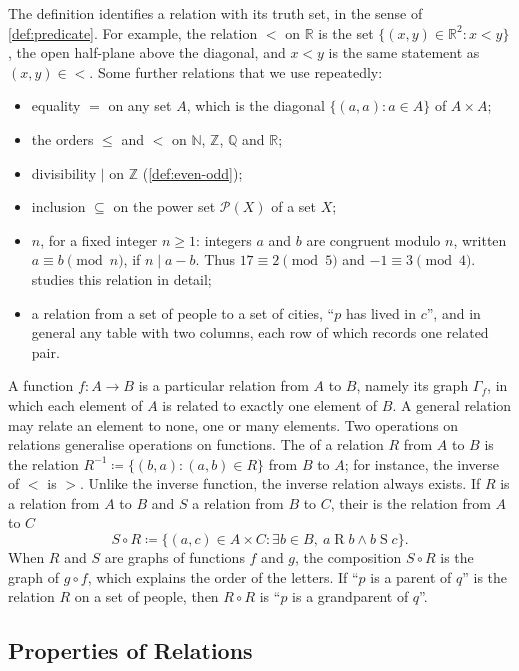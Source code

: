 The definition identifies a relation with its truth set, in the sense of \cref{def:predicate}. For example, the relation $<$ on $\mathbb R$ is the set $\{(x,y)\in\mathbb R^2: x<y\}$, the open half-plane above the diagonal, and $x<y$ is the same statement as $(x,y)\in{<}$. Some further relations that we use repeatedly:
\begin{itemize}
\item equality $=$ on any set $A$, which is the diagonal $\{(a,a): a\in A\}$ of $A\times A$;
\item the orders $\le$ and $<$ on $\mathbb N$, $\mathbb Z$, $\mathbb Q$ and $\mathbb R$;
\item divisibility $\mid$ on $\mathbb Z$ (\cref{def:even-odd});
\item inclusion $\subseteq$ on the power set $\mathcal P(X)$ of a set $X$;
\item {} $n$, for a fixed integer $n\ge1$: integers $a$ and $b$ are congruent modulo $n$, written $a\equiv b\pmod n$, if $n\mid a-b$. Thus $17\equiv2\pmod5$ and $-1\equiv3\pmod4$.  studies this relation in detail;
\item a relation from a set of people to a set of cities, ``$p$ has lived in $c$'', and in general any table with two columns, each row of which records one related pair.
\end{itemize}

A function $f\colon A\to B$ is a particular relation from $A$ to $B$, namely its graph $\Gamma_f$, in which each element of $A$ is related to exactly one element of $B$. A general relation may relate an element to none, one or many elements. Two operations on relations generalise operations on functions. The  of a relation $R$ from $A$ to $B$ is the relation $R^{-1}\coloneqq\{(b,a): (a,b)\in R\}$ from $B$ to $A$; for instance, the inverse of $<$ is $>$. Unlike the inverse function, the inverse relation always exists. If $R$ is a relation from $A$ to $B$ and $S$ a relation from $B$ to $C$, their  is the relation from $A$ to $C$
\[
S\circ R\coloneqq\{(a,c)\in A\times C:\exists b\in B,\ a\mathrel{R}b\wedge b\mathrel{S}c\}.
\]
When $R$ and $S$ are graphs of functions $f$ and $g$, the composition $S\circ R$ is the graph of $g\circ f$, which explains the order of the letters. If ``$p$ is a parent of $q$'' is the relation $R$ on a set of people, then $R\circ R$ is ``$p$ is a grandparent of $q$''.

\subsection{Properties of Relations}

